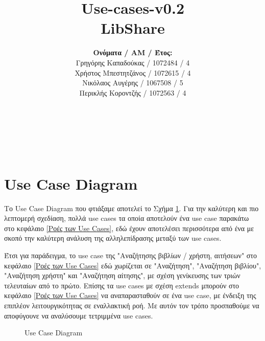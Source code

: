 \documentclass[12pt,a4paper]{article}
\title{Use-cases-v0.2 \\ LibShare}
\author{\textbf{Ονόματα / ΑΜ / Έτος:} \\ Γρηγόρης Καπαδούκας / 1072484 / 4\textdegree \\ Χρήστος Μπεστητζάνος / 1072615 / 4\textdegree \\ Νικόλαος Αυγέρης / 1067508 / 5\textdegree \\ Περικλής Κοροντζής / 1072563 / 4\textdegree}
\begin{document}
\makeatletter
\begin{center}
	\LARGE{\@title} \\
	\pagebreak
	\begin{LARGE}\@author\end{LARGE} \\
\end{center}
\pagebreak

\section{Use Case Diagram}

Το Use Case Diagram που φτιάξαμε αποτελεί το Σχήμα \ref{Use Case Diagram}. Για την καλύτερη και πιο λεπτομερή σχεδίαση, πολλά use cases τα οποία αποτελούν ένα use case παρακάτω στο κεφάλαιο \ref{Ροές των Use Cases}, εδώ έχουν αποτελέσει περισσότερα από ένα με σκοπό την καλύτερη ανάλυση της αλληλεπίδρασης μεταξύ των use cases.

Έτσι για παράδειγμα, το use case της "Αναζήτησης βιβλίων / χρήστη, αιτήσεων" στο κεφάλαιο \ref{Ροές των Use Cases} εδώ χωρίζεται σε "Αναζήτηση", "Αναζήτηση βιβλίου", "Αναζήτηση χρήστη" και "Αναζήτηση αίτησης", με σχέση γενίκευσης των τριών τελευταίων από το πρώτο. Επίσης τα use cases με σχέση extends μπορούν στο κεφάλαιο \ref{Ροές των Use Cases} να αναπαρασταθούν σε ένα use case, με ένδειξη της επιπλέον λειτουργικότητας σε εναλλακτική ροή. Με αυτόν τον τρόπο προσπαθούμε να αποφύγουνε να αναλύσουμε τετριμμένα use cases.

\begin{figure}[H]
	\caption{Use Case Diagram}
	\label{Use Case Diagram}
\end{figure}
\end{document}
